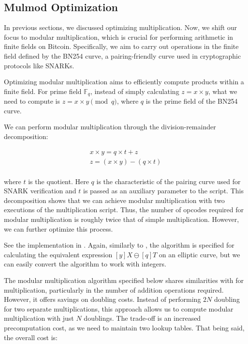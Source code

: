 \documentclass{iacrtrans}
\begin{document}
\subsection{Mulmod Optimization}
In previous sections, we discussed optimizing multiplication. Now, we shift our focus to modular multiplication, which is crucial for performing arithmetic in finite fields on Bitcoin. Specifically, we aim to carry out operations in the finite field defined by the BN254 curve, a pairing-friendly curve used in cryptographic protocols like SNARKs.

Optimizing modular multiplication aims to efficiently compute products within a finite field. For prime field $\mathbb{F}_q$, instead of simply calculating $z  = x \times y$, what we need to compute is $z = x \times y \pmod{q}$, where $q$ is the prime field of the BN254 curve.

We can perform modular multiplication through the division-remainder decomposition:

\begin{equation}
\begin{aligned} 
x \times y = q \times t + z \\
z = (x \times y) - (q \times t) \\
\end{aligned}
\end{equation}

where $t$ is the quotient. Here $q$ is the characteristic of the pairing curve used for SNARK verification and $t$ is passed as an auxiliary parameter to the script.
This decomposition shows that we can achieve modular multiplication with two executions of the multiplication script. Thus, the number of opcodes required for modular multiplication is roughly twice that of simple multiplication. However, we can further optimize this process.

See the implementation in . Again, similarly to , the algorithm is specified for calculating the equivalent expression $[y]X\ominus[q]T$ on an elliptic curve, but we can easily convert the algorithm to work with integers.

The modular multiplication algorithm specified below shares similarities with  for multiplication, particularly in the number of addition operations required. However, it offers savings on doubling costs. Instead of performing $2N$ doubling for two separate multiplications, this approach allows us to compute modular multiplication with just $N$ doublings. The trade-off is an increased precomputation cost, as we need to maintain two lookup tables. That being said, the overall cost is:
\end{document}
